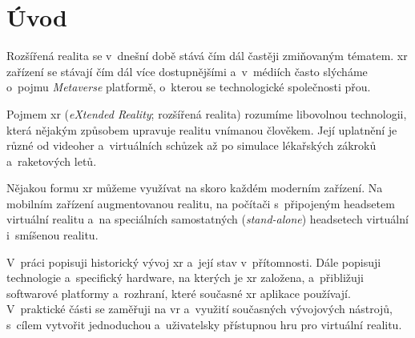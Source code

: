 \chapter*{Úvod}
Rozšířená realita se v~dnešní době stává čím dál častěji zmiňovaným tématem. \gls{xr} zařízení se stávají čím dál více dostupnějšími a~v~médiích často slýcháme o~pojmu \textit{Metaverse} \poml platformě, o~kterou se technologické společnosti přou.

Pojmem \gls{xr} (\textit{eXtended Reality}; rozšířená realita) rozumíme libovolnou technologii, která nějakým způsobem upravuje realitu vnímanou člověkem. Její uplatnění je různé \poml od videoher a~virtuálních schůzek až po simulace lékařských zákroků a~raketových letů. \cite{muni_kybernetika}

Nějakou formu \gls{xr} můžeme využívat na skoro každém moderním zařízení. Na mobilním zařízení augmentovanou realitu, na počítači s~připojeným headsetem virtuální realitu a~na speciálních samostatných (\textit{stand-alone}) headsetech virtuální i~smíšenou realitu.

V~práci popisuji historický vývoj \gls{xr} a~její stav v~přítomnosti. Dále popisuji technologie a~specifický hardware, na kterých je \gls{xr} založena, a~přibližuji softwarové platformy a~rozhraní, které současné \gls{xr} aplikace používají. V~praktické části se zaměřuji na \gls{vr} a~využití současných vývojových nástrojů, s~cílem vytvořit jednoduchou a~uživatelsky přístupnou hru pro virtuální realitu.